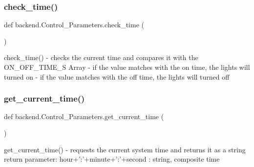 \subsubsection{\texorpdfstring{check\+\_\+time()}{check\_time()}}
{\footnotesize\ttfamily def backend.\+Control\+\_\+\+Parameters.\+check\+\_\+time (\begin{DoxyParamCaption}{ }\end{DoxyParamCaption})}

\begin{DoxyVerb}check_time()
    - checks the current time and compares it with the ON_OFF_TIME_S Array
    - if the value matches with the on time, the lights will turned on
    - if the value matches with the off time, the lights will turned off
\end{DoxyVerb}
 \mbox{\label{classbackend_1_1Control__Parameters_a1cb2bf210e04842eb8530306d10f0120_a1cb2bf210e04842eb8530306d10f0120}} 
\subsubsection{\texorpdfstring{get\+\_\+current\+\_\+time()}{get\_current\_time()}}
{\footnotesize\ttfamily def backend.\+Control\+\_\+\+Parameters.\+get\+\_\+current\+\_\+time (\begin{DoxyParamCaption}{ }\end{DoxyParamCaption})}

\begin{DoxyVerb}get_current_time()
    - requests the current system time and returns it as a string
return parameter:
    hour+':'+minute+':'+second : string, composite time
\end{DoxyVerb}
 \mbox{\label{classbackend_1_1Control__Parameters_ae878384dd1a339751250d6868daa7ed0_ae878384dd1a339751250d6868daa7ed0}} 
